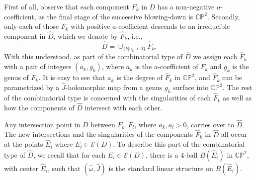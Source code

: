 \documentclass[11pt]{amsart}
\theoremstyle{plain}
\numberwithin{theorem}{section}
\theoremstyle{definition}
\newcommand{\C}{{\mathbb C}}
\renewcommand{\P}{{\mathbb P}}
\newcommand{\E}{{\mathcal E}}
\begin{document}
First of all, observe that each component $F_k$ in $D$ has a 
non-negative $a$-coefficient, as the final stage of the successive blowing-down is $\C\P^2$.
Secondly, only each of those $F_k$ with positive $a$-coefficient descends to an irreducible component in $\hat{D}$, which we denote by $\hat{F}_k$, i.e.,
$$
\hat{D}=\cup_{\{k| a_k>0\}} \hat{F}_k.
$$
With this understood, as part of the combinatorial type of $\hat{D}$ we assign each $\hat{F}_k$ with a pair of integers $(a_k,g_k)$, where $a_k$ is the $a$-coefficient of $F_k$ and $g_k$ is the genus of $F_k$. It is easy to 
see that $a_k$ is the degree of $\hat{F}_k$ in $\C\P^2$, and $\hat{F}_k$ can be parametrized by a  $\hat{J}$-holomorphic map from a genus $g_k$ surface into $\C\P^2$. The rest of the combinatorial type is concerned with the singularities of each $\hat{F}_k$ as well as how the components of $\hat{D}$ intersect with each other. 

Any intersection point in $D$ between $F_k,F_l$, where $a_k,a_l>0$, carries over to $\hat{D}$. The new intersections and the singularities of the components $\hat{F}_k$ in 
$\hat{D}$ all occur at the points $\hat{E}_i$ where $E_i\in\E(D)$. To describe this part of the combinatorial type of $\hat{D}$, we recall that for each $E_i\in\E(D)$, there is a $4$-ball $B(\hat{E}_i)$ in $\C\P^2$, with center $\hat{E}_i$, such that $(\hat{\omega},\hat{J})$ is the standard linear structure on $B(\hat{E}_i)$.

\vspace{2mm}
\end{document}
